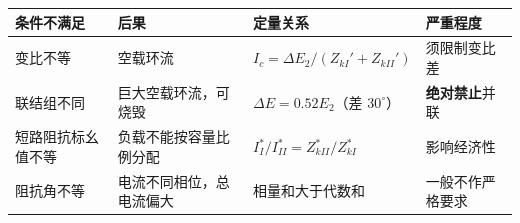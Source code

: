 \begin{center}
\begin{tabular}{@{}p{2.5cm}p{3.6cm}p{4.4cm}p{2.6cm}@{}}
\toprule
条件不满足 & 后果 & 定量关系 & 严重程度 \\
\midrule
变比不等 & 空载环流 & $I_c=\Delta E_2/(Z_{kI}'+Z_{kII}')$ & 须限制变比差 \\
联结组不同 & 巨大空载环流，可烧毁 & $\Delta E=0.52E_2$（差 $30^\circ$） & \textbf{绝对禁止}并联 \\
短路阻抗标幺值不等 & 负载不能按容量比例分配 & $I_I^{*}/I_{II}^{*}=Z_{kII}^{*}/Z_{kI}^{*}$ & 影响经济性 \\
阻抗角不等 & 电流不同相位，总电流偏大 & 相量和大于代数和 & 一般不作严格要求 \\
\bottomrule
\end{tabular}
\end{center}

